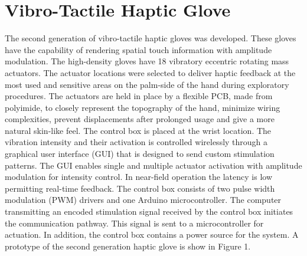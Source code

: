 \section{Vibro-Tactile Haptic Glove}
The second generation of vibro-tactile haptic gloves was developed. These gloves have the capability of rendering spatial touch information with amplitude modulation. The high-density gloves have 18 vibratory eccentric rotating mass actuators. The actuator locations were selected to deliver haptic feedback at the most used and sensitive areas on the palm-side of the hand during exploratory procedures. The actuators are held in place by a flexible PCB, made from polyimide, to closely represent the topography of the hand, minimize wiring complexities, prevent displacements after prolonged usage and give a more natural skin-like feel.
The control box is placed at the wrist location. The vibration
intensity and their activation is controlled wirelessly through a
graphical user interface (GUI) that is designed to send custom
stimulation patterns. The GUI enables single and multiple actuator
activation with amplitude modulation for intensity control. In near-field operation the latency is low permitting real-time feedback. The control box consists of two pulse width modulation (PWM) drivers and one Arduino microcontroller. The computer transmitting an encoded stimulation signal received by the control box initiates the communication pathway. This signal is sent to a microcontroller for actuation. In addition, the control box contains a power source for the system. A prototype of the second generation haptic glove is show in Figure 1. 

